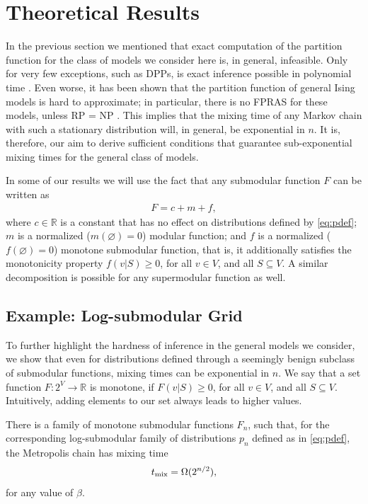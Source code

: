 \section{Theoretical Results}
In the previous section we mentioned that exact computation of the partition function for the class of models we consider here is, in general, infeasible.
Only for very few exceptions, such as DPPs, is exact inference possible in polynomial time \cite{kulesza12}.
Even worse, it has been shown that the partition function of general Ising models is hard to approximate; in particular, there is no FPRAS for these models, unless RP = NP \cite{jerrum93}.
This implies that the mixing time of any Markov chain with such a stationary distribution will, in general, be exponential in $n$.
It is, therefore, our aim to derive sufficient conditions that guarantee sub-exponential mixing times for the general class of models.

In some of our results we will use the fact that any submodular function $F$ can be written as
\begin{align} \label{eq:decomp}
  F = c + m + f,
\end{align}
where $c \in \mathbb{R}$ is a constant that has no effect on distributions defined by \eqref{eq:pdef}; $m$ is a normalized ($m(\varnothing) = 0$) modular function; and $f$ is a normalized ($f(\varnothing) = 0$) monotone submodular function, that is, it additionally satisfies the monotonicity property $f(v|S) \geq 0$, for all $v \in V$, and all $S \subseteq V$.
A similar decomposition is possible for any supermodular function as well.


\subsection{Example: Log-submodular Grid}
To further highlight the hardness of inference in the general models we consider, we show that even for distributions defined through a seemingly benign subclass of submodular functions, mixing times can be exponential in $n$.
We say that a set function $F : 2^V \to \mathbb{R}$ is monotone, if $F(v|S) \geq 0$, for all $v \in V$, and all $S \subseteq V$.
Intuitively, adding elements to our set always leads to higher values.
\begin{lemma}
There is a family of monotone submodular functions $F_n$, such that, for the corresponding log-submodular family of distributions $p_n$ defined as in \eqref{eq:pdef}, the Metropolis chain has mixing time
\begin{align*}
  t_{\mathrm{mix}}  = \Omega(2^{n/2}),
\end{align*}
for any value of $\beta$.
\end{lemma}

